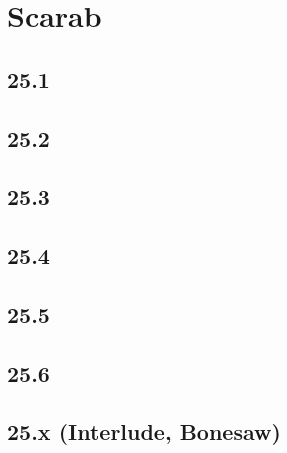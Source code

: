 \part{Scarab}
 \chapter{25.1}
 \chapter{25.2}
 \chapter{25.3}
 \chapter{25.4}
 \chapter{25.5}
 \chapter{25.6}
 \chapter{25.x (Interlude, Bonesaw)}








